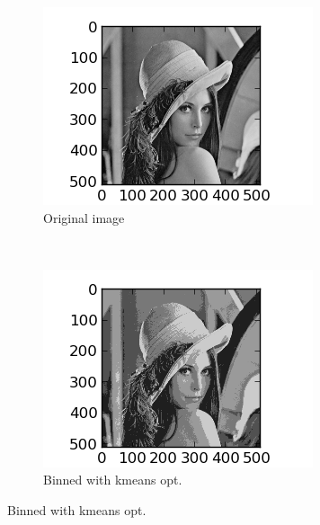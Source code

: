 \documentclass{article}
\begin{document}
    \begin{figure}
            \centering
            \begin{subfigure}[b]{0.3\textwidth}
                    \centering
                    \includegraphics[width=\textwidth]{original.png}
                    \caption{Original image}
                    \label{fig:original}
            \end{subfigure}%
            ~ %
            \begin{subfigure}[b]{0.3\textwidth}
                    \centering
                    \includegraphics[width=\textwidth]{compressed.png}
                    \caption{Binned with kmeans opt.}

\end{subfigure}
\end{figure}
\end{document}
